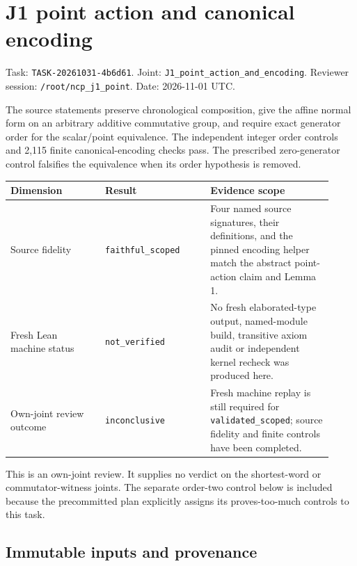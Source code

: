 \documentclass[10pt]{article}
\begin{document}
\section*{J1 point action and canonical encoding}


Task: \texttt{TASK\allowbreak{}-\allowbreak{}20261031\allowbreak{}-\allowbreak{}4b6d61}. Joint: \texttt{J1\allowbreak{}\_\allowbreak{}point\allowbreak{}\_\allowbreak{}action\allowbreak{}\_\allowbreak{}and\allowbreak{}\_\allowbreak{}encoding}.
Reviewer session: \texttt{\allowbreak{}/\allowbreak{}root\allowbreak{}/\allowbreak{}ncp\allowbreak{}\_\allowbreak{}j1\allowbreak{}\_\allowbreak{}point}. Date: 2026-11-01 UTC.


The source statements preserve chronological composition, give the affine normal form on an arbitrary additive commutative group, and require exact generator order for the scalar/point equivalence. The independent integer order controls and 2,115 finite canonical-encoding checks pass. The prescribed zero-generator control falsifies the equivalence when its order hypothesis is removed.


\small\begin{longtable}{>{\raggedright\arraybackslash}p{0.27\linewidth}>{\raggedright\arraybackslash}p{0.3\linewidth}>{\raggedright\arraybackslash}p{0.35\linewidth}}
\hline
Dimension & Result & Evidence scope \\ \hline
Source fidelity & \texttt{faithful\allowbreak{}\_\allowbreak{}scoped} & Four named source signatures, their definitions, and the pinned encoding helper match the abstract point-action claim and Lemma 1. \\
Fresh Lean machine status & \texttt{not\allowbreak{}\_\allowbreak{}verified} & No fresh elaborated-type output, named-module build, transitive axiom audit or independent kernel recheck was produced here. \\
Own-joint review outcome & \texttt{inconclusive} & Fresh machine replay is still required for \texttt{validated\allowbreak{}\_\allowbreak{}scoped}; source fidelity and finite controls have been completed. \\
\hline\end{longtable}\normalsize


This is an own-joint review. It supplies no verdict on the shortest-word or commutator-witness joints. The separate order-two control below is included because the precommitted plan explicitly assigns its proves-too-much controls to this task.


\subsection*{Immutable inputs and provenance}
\end{document}
